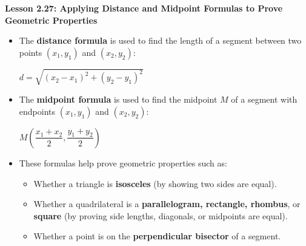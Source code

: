 \begin{center}
\textbf{Lesson 2.27: Applying Distance and Midpoint Formulas to Prove Geometric Properties}
\end{center}

\vspace*{-1.5ex}

\begin{itemize}
    \item The \textbf{distance formula} is used to find the length of a segment between two points $(x_1, y_1)$ and $(x_2, y_2)$:

{\centering $
    d = \sqrt{(x_2 - x_1)^2 + (y_2 - y_1)^2}
$\par}
    \item The \textbf{midpoint formula} is used to find the midpoint $M$ of a segment with endpoints $(x_1, y_1)$ and $(x_2, y_2)$:

{\centering $
    M \left( \dfrac{x_1 + x_2}{2}, \dfrac{y_1 + y_2}{2} \right)
$\par}
    \item These formulas help prove geometric properties such as:
    \begin{itemize}
        \item Whether a triangle is \textbf{isosceles} (by showing two sides are equal).
        \item Whether a quadrilateral is a \textbf{parallelogram, rectangle, rhombus}, or \textbf{square} (by proving side lengths, diagonals, or midpoints are equal).
        \item Whether a point is on the \textbf{perpendicular bisector} of a segment.
    \end{itemize}
\end{itemize}
